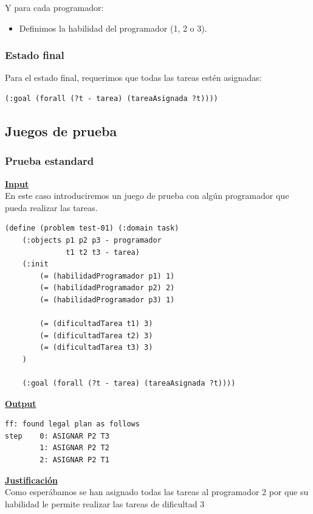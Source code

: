 \documentclass[11pt]{article}
\begin{document}
\noindent
Y para cada programador:
\begin{itemize}
  	\item Definimos la habilidad del programador (1, 2 o 3).
\end{itemize}

\subsubsection{Estado final}
Para el estado final, requerimos que todas las tareas estén asignadas:

\begin{verbatim}
(:goal (forall (?t - tarea) (tareaAsignada ?t))))
\end{verbatim}

\subsection{Juegos de prueba}

\subsubsection{Prueba estandard}
\underline{\textbf{Input}}\\

En este caso introduciremos un juego de prueba con algún programador que pueda realizar las tareas.
\begin{verbatim}
(define (problem test-01) (:domain task)
    (:objects p1 p2 p3 - programador
			  t1 t2 t3 - tarea)
    (:init
        (= (habilidadProgramador p1) 1)
        (= (habilidadProgramador p2) 2)
        (= (habilidadProgramador p3) 1)
        
        (= (dificultadTarea t1) 3)
        (= (dificultadTarea t2) 3)
        (= (dificultadTarea t3) 3)
    )

    (:goal (forall (?t - tarea) (tareaAsignada ?t))))
 \end{verbatim}
 \medskip
 
 \noindent \underline{\textbf{Output}}
\medskip
\begin{verbatim}
ff: found legal plan as follows
step    0: ASIGNAR P2 T3
        1: ASIGNAR P2 T2
        2: ASIGNAR P2 T1
\end{verbatim}
\medskip

\noindent \underline{\textbf{Justificación}}\\

Como esperábamos se han asignado todas las tareas al programador 2 por que su habilidad le permite realizar las tareas de dificultad 3
\end{document}
